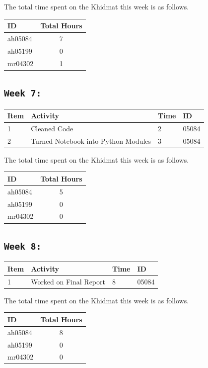 \documentclass{article}
\begin{document}
The total time spent on the Khidmat this week is as follows.    
\begin{center}
\begin{tabular}{|l|c|}
  \hline
  \textbf{ID} & \textbf{Total Hours}\\\hline
  ah05084 & 7 \\\hline
  ah05199 & 0 \\\hline
  mr04302 & 1 \\\hline
\end{tabular}
\end{center}
\newpage
\subsection{\texttt{Week 7: }}
\begin{center}
\begin{tabular}{|l|l|l|l|}
  \hline
  \textbf{Item} 	& \textbf{Activity} & \textbf{Time} & \textbf{ID} \\\hline
  1 & Cleaned Code & 2 & 05084 \\ \hline
  2 & Turned Notebook into Python Modules & 3 & 05084 \\ \hline
\end{tabular}
    
\end{center}
The total time spent on the Khidmat this week is as follows.    
\begin{center}
\begin{tabular}{|l|c|}
  \hline
  \textbf{ID} & \textbf{Total Hours}\\\hline
  ah05084 & 5 \\\hline
  ah05199 & 0 \\\hline
  mr04302 & 0 \\\hline
\end{tabular}
\end{center}
\newpage
\subsection{\texttt{Week 8: }}
\begin{center}
\begin{tabular}{|l|l|l|l|}
  \hline
  \textbf{Item} 	& \textbf{Activity} & \textbf{Time} & \textbf{ID} \\\hline
  1 & Worked on Final Report & 8 & 05084 \\ \hline
  
\end{tabular}
    
\end{center}
The total time spent on the Khidmat this week is as follows.    
\begin{center}
\begin{tabular}{|l|c|}
  \hline
  \textbf{ID} & \textbf{Total Hours}\\\hline
  ah05084 & 8 \\\hline
  ah05199 & 0 \\\hline
  mr04302 & 0 \\\hline
\end{tabular}
\end{center}
\newpage
\end{document}
